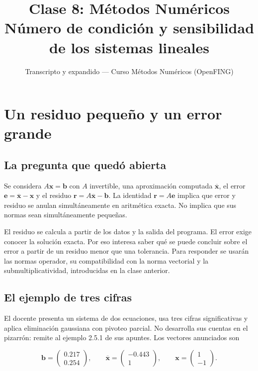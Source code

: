 \documentclass[12pt,a4paper]{article}
\title{\textbf{Clase 8: Métodos Numéricos} \\[0.3em]
        \large{Número de condición y sensibilidad de los sistemas lineales}}
\author{Transcripto y expandido --- Curso Métodos Numéricos (OpenFING)}
\date{}
\begin{document}
\maketitle
\thispagestyle{empty}
\newpage
\tableofcontents
\newpage

\section{Un residuo pequeño y un error grande}

\subsection{La pregunta que quedó abierta}

Se considera $A\mathbf x=\mathbf b$ con $A$ invertible, una aproximación computada $\overline{\mathbf x}$, el error $\mathbf e=\overline{\mathbf x}-\mathbf x$ y el residuo $\mathbf r=A\overline{\mathbf x}-\mathbf b$. La identidad $\mathbf r=A\mathbf e$ implica que error y residuo se anulan simultáneamente en aritmética exacta. No implica que sus normas sean simultáneamente pequeñas.

El residuo se calcula a partir de los datos y la salida del programa. El error exige conocer la solución exacta. Por eso interesa saber qué se puede concluir sobre el error a partir de un residuo menor que una tolerancia. Para responder se usarán las normas operador, su compatibilidad con la norma vectorial y la submultiplicatividad, introducidas en la clase anterior.

\subsection{El ejemplo de tres cifras}

El docente presenta un sistema de dos ecuaciones, usa tres cifras significativas y aplica eliminación gaussiana con pivoteo parcial. No desarrolla sus cuentas en el pizarrón: remite al ejemplo 2.5.1 de sus apuntes. Los vectores anunciados son

\[
\mathbf b=\begin{pmatrix}0.217\\0.254\end{pmatrix},\qquad
\overline{\mathbf x}=\begin{pmatrix}-0.443\\1\end{pmatrix},\qquad
\mathbf x=\begin{pmatrix}1\\-1\end{pmatrix}.
\]
\end{document}
